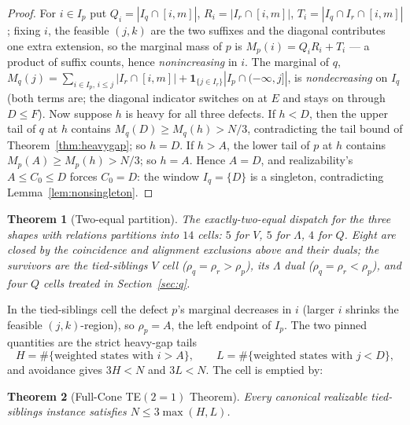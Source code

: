 \documentclass[11pt]{article}
\newtheorem{theorem}{Theorem}[section]
\theoremstyle{definition}
\theoremstyle{remark}
\begin{document}
\begin{proof}
For $i\in I_p$ put $Q_i=|I_q\cap[i,m]|$, $R_i=|I_r\cap[i,m]|$, $T_i=|I_q\cap I_r\cap[i,m]|$;
fixing $i$, the feasible $(j,k)$ are the two suffixes and the diagonal contributes one
extra extension, so the marginal mass of $p$ is $M_p(i)=Q_iR_i+T_i$ --- a product of
suffix counts, hence \emph{nonincreasing} in $i$. The marginal of $q$,
$M_q(j)=\sum_{i\in I_p,\,i\le j}|I_r\cap[i,m]|+\mathbf1_{\{j\in I_r\}}|I_p\cap(-\infty,j]|$,
is \emph{nondecreasing} on $I_q$ (both terms are; the diagonal indicator switches on at
$E$ and stays on through $D\le F$). Now suppose $h$ is heavy for all three defects. If
$h<D$, then the upper tail of $q$ at $h$ contains $M_q(D)\ge M_q(h)>N/3$, contradicting
the tail bound of Theorem~\ref{thm:heavygap}; so $h=D$. If $h>A$, the lower tail of $p$
at $h$ contains $M_p(A)\ge M_p(h)>N/3$; so $h=A$. Hence $A=D$, and realizability's
$A\le C_0\le D$ forces $C_0=D$: the window $I_q=\{D\}$ is a singleton, contradicting
Lemma~\ref{lem:nonsingleton}.
\end{proof}

\begin{theorem}[Two-equal partition]\label{thm:partition}
The exactly-two-equal dispatch for the three shapes with relations partitions into $14$
cells: $5$ for $V$, $5$ for $\Lambda$, $4$ for $Q$. Eight are closed by the coincidence
and alignment exclusions above and their duals; the survivors are the \emph{tied-siblings}
$V$ cell ($\rho_q=\rho_r>\rho_p$), its $\Lambda$ dual ($\rho_q=\rho_r<\rho_p$), and four
$Q$ cells treated in Section~\ref{sec:q}.
\end{theorem}

In the tied-siblings cell the defect $p$'s marginal decreases in $i$ (larger $i$ shrinks
the feasible $(j,k)$-region), so $\rho_p=A$, the left endpoint of $I_p$. The two pinned
quantities are the strict heavy-gap tails
\[
H=\#\{\text{weighted states with }i>A\},\qquad
L=\#\{\text{weighted states with }j<D\},
\]
and avoidance gives $3H<N$ and $3L<N$. The cell is emptied by:

\begin{theorem}[Full-Cone TE$(2{=}1)$ Theorem]\label{thm:fullcone}
Every canonical realizable tied-siblings instance satisfies $N\le3\max(H,L)$.
\end{theorem}
\end{document}
